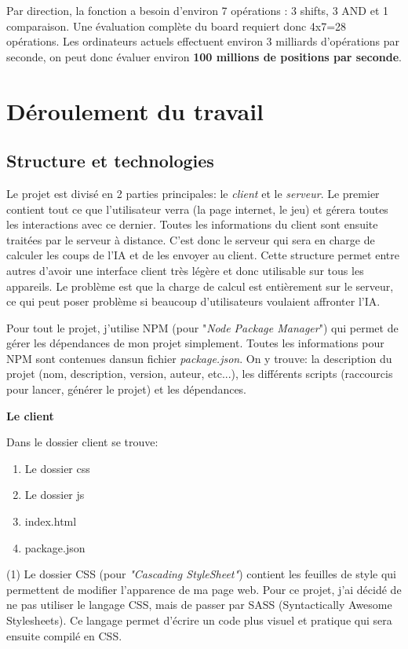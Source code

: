 \documentclass[a4paper]{article}
\newcommand{\ptitle}[1]{\vspace{10pt}
{\large \noindent \textbf{#1}}}
\begin{document}
    Par direction, la fonction a besoin d'environ 7 opérations : 3 shifts, 3 AND et 1 comparaison. Une évaluation complète du board requiert donc 4x7=28 opérations. Les ordinateurs actuels effectuent environ 3 milliards d'opérations par seconde, on peut donc évaluer environ \textbf{100 millions de positions par seconde}.

\section{Déroulement du travail}

\subsection{Structure et technologies}

	Le projet est divisé en 2 parties principales: le \textit{client} et le \textit{serveur}. Le premier contient tout ce que l'utilisateur verra (la page internet, le jeu) et gérera toutes les interactions avec ce dernier. Toutes les informations du client sont ensuite traitées par le serveur à distance. C'est donc le serveur qui sera en charge de calculer les coups de l'IA et de les envoyer au client. Cette structure permet entre autres d'avoir une interface client très légère et donc utilisable sur tous les appareils. Le problème est que la charge de calcul est entièrement sur le serveur, ce qui peut poser problème si beaucoup d'utilisateurs voulaient affronter l'IA.

	Pour tout le projet, j'utilise NPM (pour  "\textit{Node Package Manager}") qui permet de gérer les dépendances de mon projet simplement. Toutes les informations pour NPM sont contenues dansun fichier \textit{package.json}. On y trouve: la description du projet (nom, description, version, auteur, etc...), les différents scripts (raccourcis pour lancer, générer le projet) et les dépendances.

    \ptitle{Le client}

	\noindent Dans le dossier client se trouve:
	\begin{enumerate}
		\item Le dossier css
		\item Le dossier js
		\item index.html
		\item package.json
	\end{enumerate}
    \vspace{5pt}

	(1) Le dossier CSS (pour \textit{"Cascading StyleSheet"}) contient les feuilles de style qui permettent de modifier l'apparence de ma page web. Pour ce projet, j'ai décidé de ne pas utiliser le langage CSS, mais de passer par SASS (Syntactically Awesome Stylesheets). Ce langage permet d'écrire un code plus visuel et pratique qui sera ensuite compilé en CSS.
\end{document}
